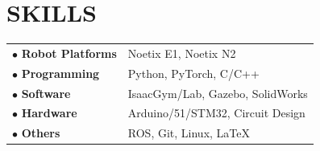 \documentclass[a4paper,11pt]{article}
\begin{document}
\section{SKILLS}
\begin{tabularx}{\linewidth}{@{}l X@{}}
$\bullet$ \textbf{Robot Platforms} & Noetix E1, Noetix N2 \\[3.75pt]
$\bullet$ \textbf{Programming} & Python, PyTorch, C/C++ \\[3.75pt]
$\bullet$ \textbf{Software} & IsaacGym/Lab, Gazebo, SolidWorks \\[3.75pt]
$\bullet$ \textbf{Hardware} & Arduino/51/STM32, Circuit Design \\[3.75pt]
$\bullet$ \textbf{Others} & ROS, Git, Linux, LaTeX \\
\end{tabularx}
\end{document}
